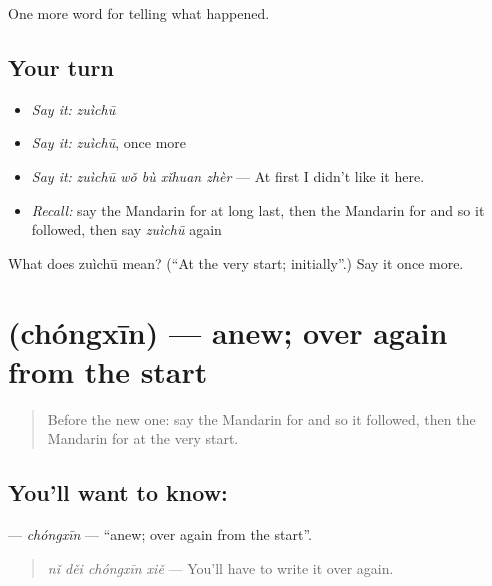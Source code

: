 \begin{grammarlens}[title={What you've built}]
One more word for telling what happened.
\end{grammarlens}

\subsection*{Your turn}
\begin{itemize}
\raggedright
  \item \emph{Say it:} \emph{zuìchū}
  \item \emph{Say it:} \emph{zuìchū}, once more
  \item \emph{Say it:} \emph{zuìchū wǒ bù xǐhuan zhèr} — At first I didn't like it here.
  \item \emph{Recall:} say the Mandarin for at long last, then the Mandarin for and so it followed, then say \emph{zuìchū} again
\end{itemize}

\begin{tcolorbox}[breakable,colback=teal!4,colframe=teal!35!black,title={Before you move on}]
What does zuìchū mean? (\textquotedblleft{}At the very start; initially\textquotedblright{}.) Say it once more.
\end{tcolorbox}
\section[\texorpdfstring{\zh{重新} (chóngxīn)}{重新 (chóngxīn)}]{ (chóngxīn) — anew; over again from the start}

\label{lesson:ZH-C295-chongxin}



\begin{quote}
Before the new one: say the Mandarin for and so it followed, then the Mandarin for at the very start.
\end{quote}

\subsection*{You'll want to know: }
\textbf{} — \emph{chóngxīn} — \textquotedblleft{}anew; over again from the start\textquotedblright{}.

\begin{quote}
\textbf{} \emph{nǐ děi chóngxīn xiě} — You'll have to write it over again.
\end{quote}

